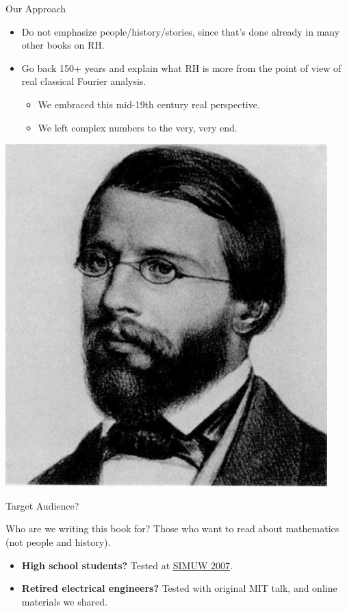 \documentclass{beamer}
\begin{document}
\begin{frame}{Our Approach}
  \begin{block}{}
    \begin{itemize}
      \item Do not emphasize people/history/stories, since that's done already in many other books on RH.
      \item   Go back 150+ years and explain what RH is more from the point of view of real classical Fourier analysis.
            \begin{itemize}
              \item We embraced this mid-19th century real perspective.
              \item We left complex numbers to the very, very end.
            \end{itemize}
    \end{itemize}
  \end{block}
  \begin{center}
    \includegraphics[height=.4\textheight]{pics/riemann}
  \end{center}

\end{frame}


\begin{frame}{Target Audience?}

  Who are we writing this book for? Those who want to read about mathematics (not people and history).

  \begin{itemize}
    \item \textbf{High school students?} Tested at \href{https://wstein.org/edu/2007/simuw07/}{SIMUW 2007}.
    \item \textbf{Retired electrical engineers?}  Tested with original MIT talk, and  online materials we shared.
  \end{itemize}


\end{frame}
\end{document}
